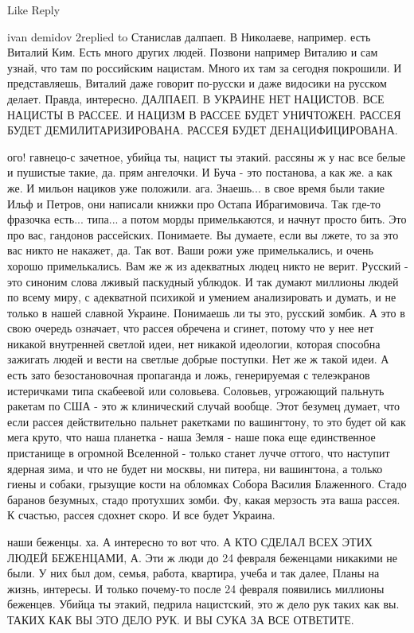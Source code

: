 		Like Reply

ivan demidov 2replied to Станислав далпаеп. В Николаеве, например. есть Виталий
Ким. Есть много других людей. Позвони например Виталию и сам узнай, что там по
российским нацистам. Много их там за сегодня покрошили. И представляешь,
Виталий даже говорит по-русски и даже видосики на русском делает. Правда,
интересно. ДАЛПАЕП. В УКРАИНЕ НЕТ НАЦИСТОВ. ВСЕ НАЦИСТЫ В РАССЕЕ. И НАЦИЗМ В
РАССЕЕ БУДЕТ УНИЧТОЖЕН. РАССЕЯ БУДЕТ ДЕМИЛИТАРИЗИРОВАНА. РАССЕЯ БУДЕТ
ДЕНАЦИФИЦИРОВАНА.

ого! гавнецо-с зачетное, убийца ты, нацист ты этакий. рассяны ж у нас все белые
и пушистые такие, да. прям ангелочки. И Буча - это постанова, а как же. а как
же. И мильон нациков уже положили. ага. Знаешь... в свое время были такие Ильф
и Петров, они написали книжки про Остапа Ибрагимовича. Так где-то фразочка
есть... типа... а потом морды примелькаются, и начнут просто бить. Это про вас,
гандонов рассейских. Понимаете. Вы думаете, если вы лжете, то за это вас никто
не накажет, да. Так вот. Ваши рожи уже примелькались, и очень хорошо
примелькались. Вам же ж из адекватных людец никто не верит. Русский - это
синоним слова лживый паскудный ублюдок. И так думают миллионы людей по всему
миру, с адекватной психикой и умением анализировать и думать, и не только в
нашей славной Украине. Понимаешь ли ты это, русский зомбик. А это в свою
очередь означает, что рассея обречена и сгинет, потому что у нее нет никакой
внутренней светлой идеи, нет никакой идеологии, которая способна зажигать людей
и вести на светлые добрые поступки. Нет же ж такой идеи. А есть зато
безостановочная пропаганда и ложь, генерируемая с телеэкранов истеричками типа
скабеевой или соловьева. Соловьев, угрожающий пальнуть ракетам по США - это ж
клинический случай вообще. Этот безумец думает, что если рассея действительно
пальнет ракетками по вашингтону, то это будет ой как мега круто, что наша
планетка - наша Земля - наше пока еще единственное пристанище в огромной
Вселенной - только станет лучче оттого, что наступит ядерная зима, и что не
будет ни москвы, ни питера, ни вашингтона, а только гиены и собаки, грызущие
кости на обломках Собора Василия Блаженного. Стадо баранов безумных, стадо
протухших зомби. Фу, какая мерзость эта ваша рассея. К счастью, рассея сдохнет
скоро. И все будет Украина.

наши беженцы. ха. А интересно то вот что. А КТО СДЕЛАЛ ВСЕХ ЭТИХ ЛЮДЕЙ
БЕЖЕНЦАМИ, А. Эти ж люди до 24 февраля беженцами никакими не были. У них был
дом, семья, работа, квартира, учеба и так далее, Планы на жизнь, интересы. И
только почему-то после 24 февраля появились миллионы беженцев. Убийца ты
этакий, педрила нацистский, это ж дело рук таких как вы. ТАКИХ КАК ВЫ ЭТО ДЕЛО
РУК. И ВЫ СУКА ЗА ВСЕ ОТВЕТИТЕ.

